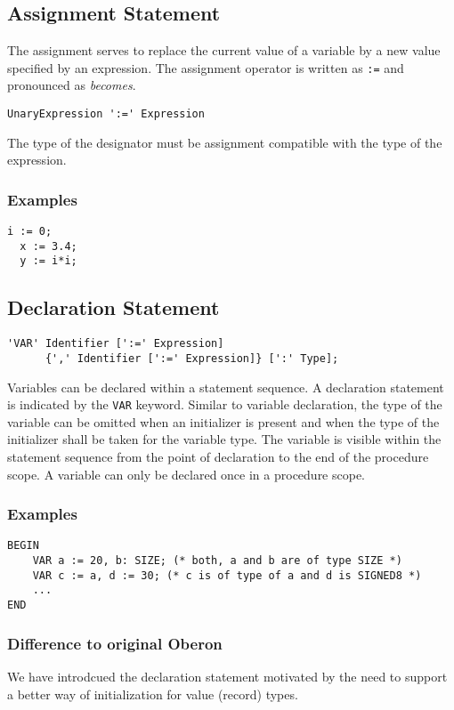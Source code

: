 \documentclass[a4wide,11pt]{article}
\begin{document}
\subsection{Assignment Statement}
The assignment serves to replace the current value of a variable by a new value specified by an expression.
The assignment operator is written as \lstinline":="  and pronounced as \emph{becomes}.

\begin{lstlisting}[style=ebnf]
	UnaryExpression ':=' Expression
\end{lstlisting}

The type of the designator must be assignment compatible with the type of the expression.

\begin{annotation}
\subsubsection{Examples}
\begin{lstlisting}[style=example,caption=Examples of Assignments]
  i := 0;
  x := 3.4;
  y := i*i;
\end{lstlisting}
\end{annotation}

\subsection{Declaration Statement}
\begin{lstlisting}[style=ebnf]
'VAR' Identifier [':=' Expression]
      {',' Identifier [':=' Expression]} [':' Type];
\end{lstlisting}

Variables can be declared within a statement sequence. A declaration statement is indicated by the \lstinline"VAR" keyword. Similar to variable declaration, the type of the variable can be omitted when an initializer is present and when the type of the initializer shall be taken for the variable type. The variable is visible within the statement sequence from the point of declaration to the end of the procedure scope. A variable can only be declared once in a procedure scope.

\begin{annotation}
\subsubsection{Examples}
\begin{lstlisting}[style=example]
BEGIN
	VAR a := 20, b: SIZE; (* both, a and b are of type SIZE *)
	VAR c := a, d := 30; (* c is of type of a and d is SIGNED8 *)
	...
END
\end{lstlisting}

\subsubsection{Difference to original Oberon}
We have introdcued the declaration statement motivated by the need to support a better way of initialization for value (record) types.
\end{annotation}
\end{document}
